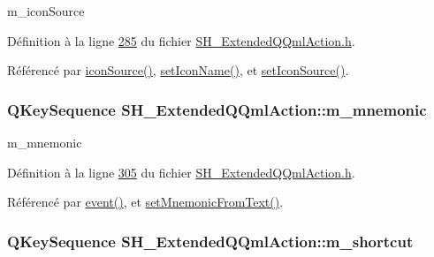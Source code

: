 m\-\_\-icon\-Source 



Définition à la ligne \hyperlink{SH__ExtendedQQmlAction_8h_source_l00285}{285} du fichier \hyperlink{SH__ExtendedQQmlAction_8h_source}{S\-H\-\_\-\-Extended\-Q\-Qml\-Action.\-h}.



Référencé par \hyperlink{classSH__ExtendedQQmlAction_a4256635783087124d3df6fa9726e7d55}{icon\-Source()}, \hyperlink{classSH__ExtendedQQmlAction_abf2bb83a227c27c4d71f1b2670dcb3b4}{set\-Icon\-Name()}, et \hyperlink{classSH__ExtendedQQmlAction_a703b29eb866cdc4d739e3f22ada92fb6}{set\-Icon\-Source()}.

\hypertarget{classSH__ExtendedQQmlAction_a7c924c07aa50a7228b6e8f31c4520896}{
\subsubsection[{m\-\_\-mnemonic}]{\setlength{\rightskip}{0pt plus 5cm}Q\-Key\-Sequence S\-H\-\_\-\-Extended\-Q\-Qml\-Action\-::m\-\_\-mnemonic\hspace{0.3cm}{\ttfamily [private]}}}\label{classSH__ExtendedQQmlAction_a7c924c07aa50a7228b6e8f31c4520896}


m\-\_\-mnemonic 



Définition à la ligne \hyperlink{SH__ExtendedQQmlAction_8h_source_l00305}{305} du fichier \hyperlink{SH__ExtendedQQmlAction_8h_source}{S\-H\-\_\-\-Extended\-Q\-Qml\-Action.\-h}.



Référencé par \hyperlink{classSH__ExtendedQQmlAction_a2067689e7c1e14a316ad6095e57d6cf6}{event()}, et \hyperlink{classSH__ExtendedQQmlAction_ae2ef95196ee3b14e505f0d028e60b8d8}{set\-Mnemonic\-From\-Text()}.

\hypertarget{classSH__ExtendedQQmlAction_ac84d3a2113efb715321b905580b08bc5}{
\subsubsection[{m\-\_\-shortcut}]{\setlength{\rightskip}{0pt plus 5cm}Q\-Key\-Sequence S\-H\-\_\-\-Extended\-Q\-Qml\-Action\-::m\-\_\-shortcut\hspace{0.3cm}{\ttfamily [private]}}}\label{classSH__ExtendedQQmlAction_ac84d3a2113efb715321b905580b08bc5}


